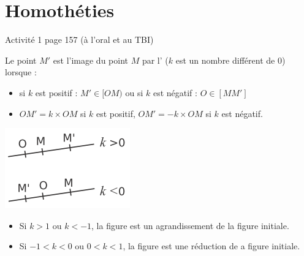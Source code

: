 \documentclass[12pt,a4paper]{article}
\date{}
\title{}
\begin{document}
	
	
	

\section{Homothéties}

\begin{myact}
	Activité 1 page 157 (à l'oral et au TBI)
\end{myact}


\begin{mydef}
\begin{multicols}{2}


	Le point $M'$ est l'image du point $M$ par l' ($k$ est un nombre différent de $0$) lorsque :
	\begin{itemize}
		\item si $k$ est positif : $M' \in [OM) $ ou si $k$ est négatif : $O \in [MM']$
		\item $OM' = k \times OM$ si $k$ est positif, $OM'=-k \times OM$ si $k$ est négatif.
	\end{itemize}

\begin{center}
	\includegraphics[scale=0.8]{img/homo_v2}	
\end{center}

\end{multicols}

\end{mydef}

\begin{myrem}
	\begin{itemize}
		\item Si $k>1$ ou $k<-1$, la figure est un agrandissement de la figure initiale.
		\item Si $-1<k<0$ ou $0<k<1$, la figure est une réduction de a figure initiale. 
	\end{itemize}
\end{myrem}
\end{document}
